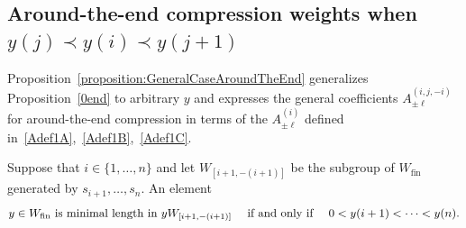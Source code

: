 \documentclass[11pt]{article}
\theoremstyle{plain}
\theoremstyle{definition}
\theoremstyle{remark}
\numberwithin{equation}{section}
\newcounter{r}
\newcounter{s}
\begin{document}
\subsection{Around-the-end compression weights when $y(j)\prec y(i)\prec y(j+1)$}\label{subsect: around the end general}

Proposition~\ref{proposition:GeneralCaseAroundTheEnd}
generalizes Proposition~\ref{0end} to arbitrary $y$ and expresses the general coefficients 
$A^{(i,j,-i)}_{\pm\ell}$ for around-the-end compression
in terms of the $A^{(i)}_{\pm\ell}$ defined in~\eqref{Adef1A},~\eqref{Adef1B},~\eqref{Adef1C}.


Suppose that $i\in \{1, \ldots, n\}$ and let $W_{[i+1,-(i+1)]}$ be the subgroup of $W_{\mathrm{fin}}$ generated
by $s_{i+1}, \ldots, s_n$.  An element 
$$\hbox{$y \in W_{\mathrm{fin}}$ is minimal length in $yW_{[i+1,-(i+1)]}$
\quad if and only if \quad}
0 < y(i+1) < \cdots < y(n).$$ 
\end{document}
